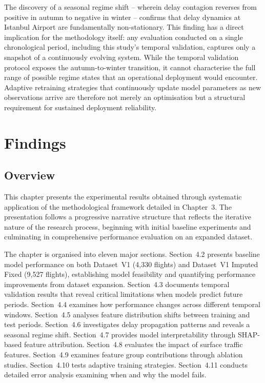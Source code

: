 \documentclass{report}
\begin{document}
The discovery of a seasonal regime shift -- wherein delay contagion reverses
from positive in autumn to negative in winter -- confirms that delay dynamics
at Istanbul Airport are fundamentally non-stationary.  This finding has a
direct implication for the methodology itself: any evaluation conducted on a
single chronological period, including this study's temporal validation,
captures only a snapshot of a continuously evolving system.  While the
temporal validation protocol exposes the autumn-to-winter transition, it
cannot characterise the full range of possible regime states that an
operational deployment would encounter.  Adaptive retraining strategies that
continuously update model parameters as new observations arrive are therefore
not merely an optimisation but a structural requirement for sustained
deployment reliability.
















\chapter{Findings}
\label{chap:findings}

\section{Overview}

This chapter presents the experimental results obtained through systematic
application of the methodological framework detailed in Chapter~3.  The
presentation follows a progressive narrative structure that reflects the
iterative nature of the research process, beginning with initial baseline
experiments and culminating in comprehensive performance evaluation on an
expanded dataset.

The chapter is organised into eleven major sections.  Section~4.2 presents
baseline model performance on both Dataset~V1 (4,330 flights) and Dataset~V1
Imputed Fixed (9,527 flights), establishing model feasibility and quantifying
performance improvements from dataset expansion.  Section~4.3 documents
temporal validation results that reveal critical limitations when models
predict future periods.  Section~4.4 examines how performance changes across
different temporal windows.  Section~4.5 analyses feature distribution shifts
between training and test periods.  Section~4.6 investigates delay propagation
patterns and reveals a seasonal regime shift.  Section~4.7 provides model
interpretability through SHAP-based feature attribution.  Section~4.8
evaluates the impact of surface traffic features.  Section~4.9 examines
feature group contributions through ablation studies.  Section~4.10 tests
adaptive training strategies.  Section~4.11 conducts detailed error analysis
examining when and why the model fails.
\end{document}
